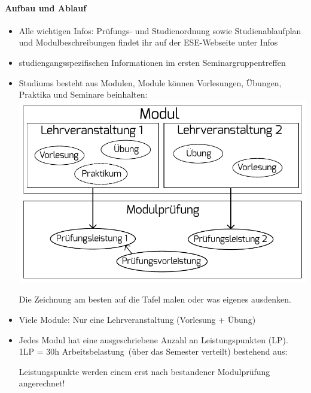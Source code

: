 \documentclass[a4paper,12pt]{report}
\begin{document}
\paragraph{Aufbau und Ablauf}
\begin{itemize}
	\item Alle wichtigen Infos: Prüfungs- und Studienordnung sowie Studienablaufplan und Modulbeschreibungen findet ihr auf der ESE-Webseite unter Infos
	\item studiengangsspezifischen Informationen im ersten Seminargruppentreffen
	\item Studiums besteht aus Modulen, Module können Vorlesungen, Übungen, Praktika und Seminare beinhalten:\\
	\includegraphics[width=\linewidth]{./modul.pdf}
	\begin{center}
	Die Zeichnung am besten auf die Tafel malen oder was eigenes ausdenken.
	\end{center}
	\item Viele Module: Nur eine Lehrveranstaltung (Vorlesung + Übung)
	\item Jedes Modul hat eine ausgeschriebene Anzahl an Leistungspunkten (LP).\\
	1LP = 30h \glqq Arbeitsbelastung\grqq\ (über das Semester verteilt) bestehend aus:
	Leistungspunkte werden einem erst nach bestandener Modulprüfung angerechnet!
\end{itemize}
\end{document}

